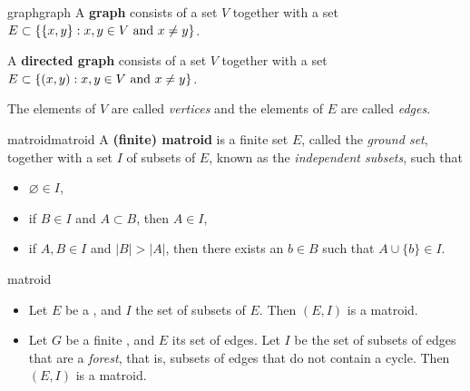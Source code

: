 \begin{topic}{graph}{graph}
    A \textbf{graph} consists of a set $V$ together with a set $E \subset \{ \{ x, y \} : x, y \in V \textup{ and } x \ne y \}$.
    
    A \textbf{directed graph} consists of a set $V$ together with a set $E \subset \{ (x, y) : x, y \in V \textup{ and } x \ne y \}$.
    
    The elements of $V$ are called \textit{vertices} and the elements of $E$ are called \textit{edges}.
\end{topic}

\begin{topic}{matroid}{matroid}
    A \textbf{(finite) matroid} is a finite set $E$, called the \textit{ground set}, together with a set $I$ of subsets of $E$, known as the \textit{independent subsets}, such that
    \begin{itemize}
        \item $\varnothing \in I$,
        \item if $B \in I$ and $A \subset B$, then $A \in I$,
        \item if $A, B \in I$ and $|B| > |A|$, then there exists an $b \in B$ such that $A \cup \{ b \} \in I$.
    \end{itemize}
\end{topic}

\begin{example}{matroid}
    \begin{itemize}
        \item Let $E$ be a , and $I$ the set of  subsets of $E$. Then $(E, I)$ is a matroid.
        \item Let $G$ be a finite , and $E$ its set of edges. Let $I$ be the set of subsets of edges that are a \textit{forest}, that is, subsets of edges that do not contain a cycle. Then $(E, I)$ is a matroid.
    \end{itemize}
\end{example}

